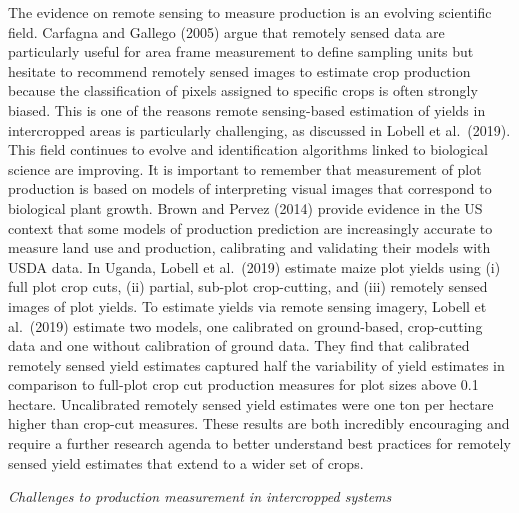 \documentclass[
]{book}
\begin{document}
The evidence on remote sensing to measure production is an evolving scientific field. Carfagna and Gallego (2005) argue that remotely sensed data are particularly useful for area frame measurement to define sampling units but hesitate to recommend remotely sensed images to estimate crop production because the classification of pixels assigned to specific crops is often strongly biased. This is one of the reasons remote sensing-based estimation of yields in intercropped areas is particularly challenging, as discussed in Lobell et al.~(2019). This field continues to evolve and identification algorithms linked to biological science are improving. It is important to remember that measurement of plot production is based on models of interpreting visual images that correspond to biological plant growth. Brown and Pervez (2014) provide evidence in the US context that some models of production prediction are increasingly accurate to measure land use and production, calibrating and validating their models with USDA data. In Uganda, Lobell et al.~(2019) estimate maize plot yields using (i) full plot crop cuts, (ii) partial, sub-plot crop-cutting, and (iii) remotely sensed images of plot yields. To estimate yields via remote sensing imagery, Lobell et al.~(2019) estimate two models, one calibrated on ground-based, crop-cutting data and one without calibration of ground data. They find that calibrated remotely sensed yield estimates captured half the variability of yield estimates in comparison to full-plot crop cut production measures for plot sizes above 0.1 hectare. Uncalibrated remotely sensed yield estimates were one ton per hectare higher than crop-cut measures. These results are both incredibly encouraging and require a further research agenda to better understand best practices for remotely sensed yield estimates that extend to a wider set of crops.

\emph{Challenges to production measurement in intercropped systems}
\end{document}

